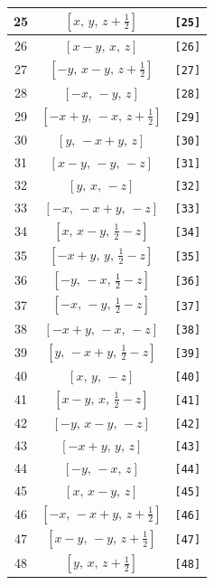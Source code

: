 \documentclass[fleqn,8pt]{jsarticle}
\begin{document}
\begin{longtable}{ccc}
25 & $\left[ x,\, y,\, z + \frac{1}{2} \right]$ & {\tt [25]} \\ \hline
26 & $\left[ x - y,\, x,\, z \right]$ & {\tt [26]} \\ \hline
27 & $\left[ - y,\, x - y,\, z + \frac{1}{2} \right]$ & {\tt [27]} \\ \hline
28 & $\left[ - x,\, - y,\, z \right]$ & {\tt [28]} \\ \hline
29 & $\left[ - x + y,\, - x,\, z + \frac{1}{2} \right]$ & {\tt [29]} \\ \hline
30 & $\left[ y,\, - x + y,\, z \right]$ & {\tt [30]} \\ \hline
31 & $\left[ x - y,\, - y,\, - z \right]$ & {\tt [31]} \\ \hline
32 & $\left[ y,\, x,\, - z \right]$ & {\tt [32]} \\ \hline
33 & $\left[ - x,\, - x + y,\, - z \right]$ & {\tt [33]} \\ \hline
34 & $\left[ x,\, x - y,\, \frac{1}{2} - z \right]$ & {\tt [34]} \\ \hline
35 & $\left[ - x + y,\, y,\, \frac{1}{2} - z \right]$ & {\tt [35]} \\ \hline
36 & $\left[ - y,\, - x,\, \frac{1}{2} - z \right]$ & {\tt [36]} \\ \hline
37 & $\left[ - x,\, - y,\, \frac{1}{2} - z \right]$ & {\tt [37]} \\ \hline
38 & $\left[ - x + y,\, - x,\, - z \right]$ & {\tt [38]} \\ \hline
39 & $\left[ y,\, - x + y,\, \frac{1}{2} - z \right]$ & {\tt [39]} \\ \hline
40 & $\left[ x,\, y,\, - z \right]$ & {\tt [40]} \\ \hline
41 & $\left[ x - y,\, x,\, \frac{1}{2} - z \right]$ & {\tt [41]} \\ \hline
42 & $\left[ - y,\, x - y,\, - z \right]$ & {\tt [42]} \\ \hline
43 & $\left[ - x + y,\, y,\, z \right]$ & {\tt [43]} \\ \hline
44 & $\left[ - y,\, - x,\, z \right]$ & {\tt [44]} \\ \hline
45 & $\left[ x,\, x - y,\, z \right]$ & {\tt [45]} \\ \hline
46 & $\left[ - x,\, - x + y,\, z + \frac{1}{2} \right]$ & {\tt [46]} \\ \hline
47 & $\left[ x - y,\, - y,\, z + \frac{1}{2} \right]$ & {\tt [47]} \\ \hline
48 & $\left[ y,\, x,\, z + \frac{1}{2} \right]$ & {\tt [48]} \\
\end{longtable}
\end{document}
